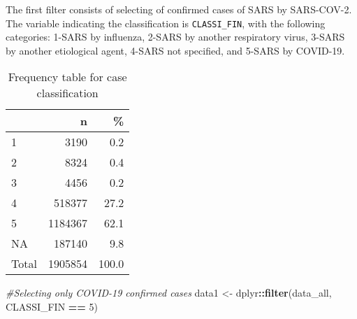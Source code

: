 \documentclass[
]{article}
\newenvironment{Shaded}{\begin{snugshade}}{\end{snugshade}}
\newcommand{\CommentTok}[1]{\textcolor[rgb]{0.56,0.35,0.01}{\textit{#1}}}
\newcommand{\DataTypeTok}[1]{\textcolor[rgb]{0.13,0.29,0.53}{#1}}
\newcommand{\DecValTok}[1]{\textcolor[rgb]{0.00,0.00,0.81}{#1}}
\newcommand{\KeywordTok}[1]{\textcolor[rgb]{0.13,0.29,0.53}{\textbf{#1}}}
\newcommand{\NormalTok}[1]{#1}
\newcommand{\OperatorTok}[1]{\textcolor[rgb]{0.81,0.36,0.00}{\textbf{#1}}}
\newcommand{\OtherTok}[1]{\textcolor[rgb]{0.56,0.35,0.01}{#1}}
\newcommand{\StringTok}[1]{\textcolor[rgb]{0.31,0.60,0.02}{#1}}
\begin{document}
The first filter consists of selecting of confirmed cases of SARS by
SARS-COV-2. The variable indicating the classification is
\texttt{CLASSI\_FIN}, with the following categories: 1-SARS by
influenza, 2-SARS by another respiratory virus, 3-SARS by another
etiological agent, 4-SARS not specified, and 5-SARS by COVID-19.

\begin{Shaded}
\end{Shaded}

\begin{table}[!h]

\caption{\label{tab:unnamed-chunk-6}Frequency table for case classification}
\centering
\begin{tabular}[t]{l|r|r}
\hline
  & n & \%\\
\hline
1 & 3190 & 0.2\\
\hline
2 & 8324 & 0.4\\
\hline
3 & 4456 & 0.2\\
\hline
4 & 518377 & 27.2\\
\hline
5 & 1184367 & 62.1\\
\hline
NA & 187140 & 9.8\\
\hline
Total & 1905854 & 100.0\\
\hline
\end{tabular}
\end{table}

\begin{Shaded}
\begin{Highlighting}[]
\CommentTok{#Selecting only COVID-19 confirmed cases}
\NormalTok{data1 <-}\StringTok{ }\NormalTok{dplyr}\OperatorTok{::}\KeywordTok{filter}\NormalTok{(data_all, CLASSI_FIN }\OperatorTok{==}\StringTok{ }\DecValTok{5}\NormalTok{)}
\end{Highlighting}
\end{Shaded}
\end{document}
